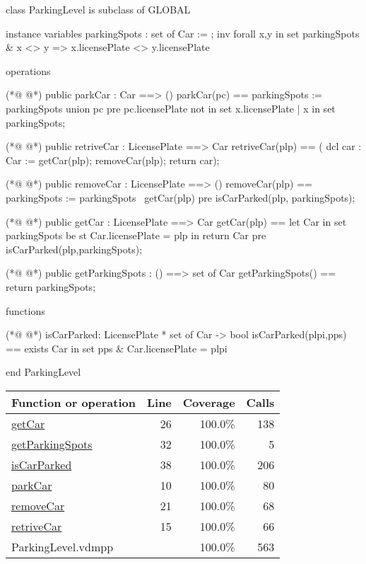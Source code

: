 \begin{vdmpp}[breaklines=true]
class ParkingLevel is subclass of GLOBAL

instance variables
 parkingSpots : set of Car := {};
inv forall x,y in set parkingSpots &
 x <> y => x.licensePlate <> y.licensePlate

operations

(*@
\label{parkCar:10}
@*)
public parkCar : Car ==> ()
parkCar(pc) ==
 parkingSpots := parkingSpots union {pc}
pre pc.licensePlate not in set {x.licensePlate | x in set parkingSpots};

(*@
\label{retriveCar:15}
@*)
public retriveCar : LicensePlate ==> Car
retriveCar(plp) == (
 dcl car : Car := getCar(plp);
 removeCar(plp);
 return car);
 
(*@
\label{removeCar:21}
@*)
public removeCar : LicensePlate ==> ()
removeCar(plp) ==
 parkingSpots := parkingSpots \ {getCar(plp)}
pre isCarParked(plp, parkingSpots);

(*@
\label{getCar:26}
@*)
public getCar : LicensePlate ==> Car
getCar(plp) ==
 let Car in set parkingSpots be st Car.licensePlate = plp
 in return Car
pre isCarParked(plp,parkingSpots);

(*@
\label{getParkingSpots:32}
@*)
public getParkingSpots : () ==> set of Car
getParkingSpots() == 
 return parkingSpots;

functions

(*@
\label{isCarParked:38}
@*)
isCarParked: LicensePlate * set of Car -> bool
isCarParked(plpi,pps) ==
 exists Car in set pps & Car.licensePlate = plpi

end ParkingLevel
\end{vdmpp}
\bigskip
\begin{longtable}{|l|r|r|r|}
\hline
Function or operation & Line & Coverage & Calls \\
\hline
\hline
\hyperref[getCar:26]{getCar} & 26&100.0\% & 138 \\
\hline
\hyperref[getParkingSpots:32]{getParkingSpots} & 32&100.0\% & 5 \\
\hline
\hyperref[isCarParked:38]{isCarParked} & 38&100.0\% & 206 \\
\hline
\hyperref[parkCar:10]{parkCar} & 10&100.0\% & 80 \\
\hline
\hyperref[removeCar:21]{removeCar} & 21&100.0\% & 68 \\
\hline
\hyperref[retriveCar:15]{retriveCar} & 15&100.0\% & 66 \\
\hline
\hline
ParkingLevel.vdmpp & & 100.0\% & 563 \\
\hline
\end{longtable}

